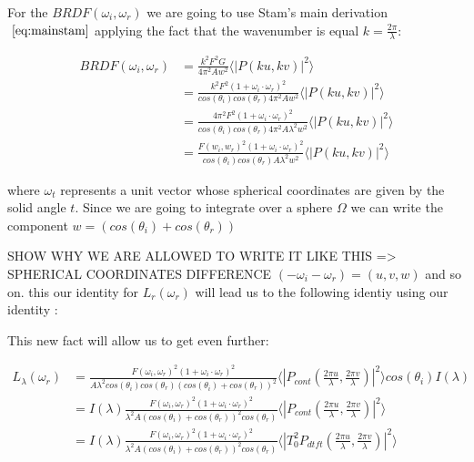 For the $BRDF(\omega_i, \omega_r)$ we are going to use Stam's main derivation $~\eqref{eq:mainstam}$ applying the fact that the wavenumber is equal $k=\frac{2\pi}{\lambda}$:

\begin{align*}
BRDF(\omega_i, \omega_r) 
& = \frac{k^2 F^2 G}{4\pi^2 A w^2} \langle \left|P(ku, kv) \right|^2\rangle \\
& = \frac{k^2 F^2 (1 + \omega_i \cdot \omega_r)^2}{cos(\theta_i)cos(\theta_r) 4\pi^2 A w^2} \langle \left|P(ku, kv)  \right|^2\rangle \\
& = \frac{4 \pi^2 F^2 (1 + \omega_i \cdot \omega_r)^2}{cos(\theta_i)cos(\theta_r) 4\pi^2 A \lambda^2 w^2} \langle \left|P(ku, kv)  \right|^2\rangle \\
& = \frac{F(w_i, w_r)^2 (1 + \omega_i \cdot \omega_r)^2}{cos(\theta_i)cos(\theta_r) A \lambda^2 w^2} \langle \left|P(ku, kv)  \right|^2\rangle
\end{align*}

where $\omega_t$ represents a unit vector whose spherical coordinates are given by the solid angle $t$.
Since we are going to integrate over a sphere $\Omega$ we can write the component $w=(cos(\theta_i)+cos(\theta_r))$

SHOW WHY WE ARE ALLOWED TO WRITE IT LIKE THIS => SPHERICAL COORDINATES DIFFERENCE $(-\omega_i - \omega_r) = (u,v,w)$ and so on.
this our identity for $L_{r}(\omega_r)$ will lead us to the following identiy using our identity :

This new fact will allow us to get even further:

\begin{align*}
L_{\lambda}(\omega_r) 
& = \frac{F(\omega_i, \omega_r)^2 (1 + \omega_i \cdot \omega_r)^2}{A \lambda^2 cos(\theta_i)cos(\theta_r)  (cos(\theta_i)+cos(\theta_r))^2} \langle \left|P_{cont}(\frac{2\pi u}{\lambda}, \frac{2\pi v}{\lambda})  \right|^2\rangle cos(\theta_i) I(\lambda) \\
& = I(\lambda) \frac{F(\omega_i, \omega_r)^2 (1 + \omega_i \cdot \omega_r)^2}{\lambda^2 A (cos(\theta_i)+cos(\theta_r))^2 cos(\theta_r)} \langle \left|P_{cont}(\frac{2\pi u}{\lambda}, \frac{2\pi v}{\lambda})  \right|^2\rangle \\
& = I(\lambda) \frac{F(\omega_i, \omega_r)^2 (1 + \omega_i \cdot \omega_r)^2}{\lambda^2 A (cos(\theta_i)+cos(\theta_r))^2 cos(\theta_r)} \langle \left|T_0^2 P_{dtft}(\frac{2\pi u}{\lambda}, \frac{2\pi v}{\lambda})  \right|^2\rangle
\end{align*}

